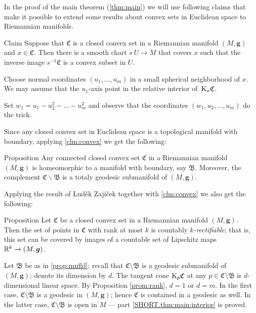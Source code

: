 \documentclass[a4paper,10pt]{article}
\begin{document}
In the proof of the main theorem (\ref{thm:main}) we will use following claims that make it possible to extend some results about convex sets in Euclidean space to Riemannian manifolds.

\begin{thm}{Claim}\label{clm:convex}
Suppose that $\mathfrak{C}$ is a closed convex set in a Riemannian manifold $(M,\bm{g})$ and $x\in \mathfrak{C}$.
Then there is a smooth chart $s\:U\to M$ that covers $x$ such that the inverse image $s^{-1}\mathfrak{C}$ is a convex subset in $U$.
\end{thm}

Choose normal coordinates $(u_1,\dots, u_m)$ in a small spherical neighborhood of $x$.
We may assume that the $u_1$-axis point in the relative interior of~$\mathrm{K}_x\mathfrak{C}$.

Set $w_1=u_1-u_2^2-\dots-u_m^2$ and observe that the coordinates
$(w_1,u_2,\dots, u_m)$ do the trick.
\qeds

Since any closed convex set in Euclidean space is a topological manifold with boundary, applying \ref{clm:convex} we get the following:

\begin{thm}{Proposition}\label{prop:mnfld}
Any connected closed convex set $\mathfrak{C}$ in a Riemannian manifold $(M,\bm{g})$ is homeomorphic to a manifold with boundary, say $\mathfrak{B}$.
Moreover, the complement $\mathfrak{C}\backslash \mathfrak{B}$ is a totaly geodesic submanifold of $(M,\bm{g})$.
\end{thm}

Applying the result of Luděk 
Zajíček \cite{zajicek} 
together with \ref{clm:convex} we also get the following:

\begin{thm}{Proposition}\label{prop:rectifiable}
Let $\mathfrak{C}$ be a closed convex set in a Riemannian manifold $(M,\bm{g})$.
Then the set of points in $\mathfrak{C}$ with rank at most $k$ is countably \emph{$k$-rectifiable};
that is, this set can be  covered by images of a countable set of Lipschitz maps $\mathbb{R}^k\to (M,\bm{g})$.
\end{thm}

Let $\mathfrak B$ be as in \ref{prop:mnfld}; recall that $\mathfrak C\setminus \mathfrak B$ is a geodesic submanifold of $(M,\bm{g})$;
denote its dimension by $d$.
The tangent cone $\mathrm{K}_p \mathfrak C$ at any $p \in \mathfrak C\setminus \mathfrak B$ is $d$-dimensional linear space.
By Proposition \ref{prom:rank}, $d=1$ or $d=m$.
In the first case, $\mathfrak C\setminus \mathfrak B$ is a geodesic in $(M,\bm{g})$;
hence $\mathfrak C$ is contained in a geodesic as well.
In the latter case, $\mathfrak C\setminus \mathfrak B$ is open in $M$ --- part \ref{SHORT.thm:main:interior} is proved.
\end{document}

